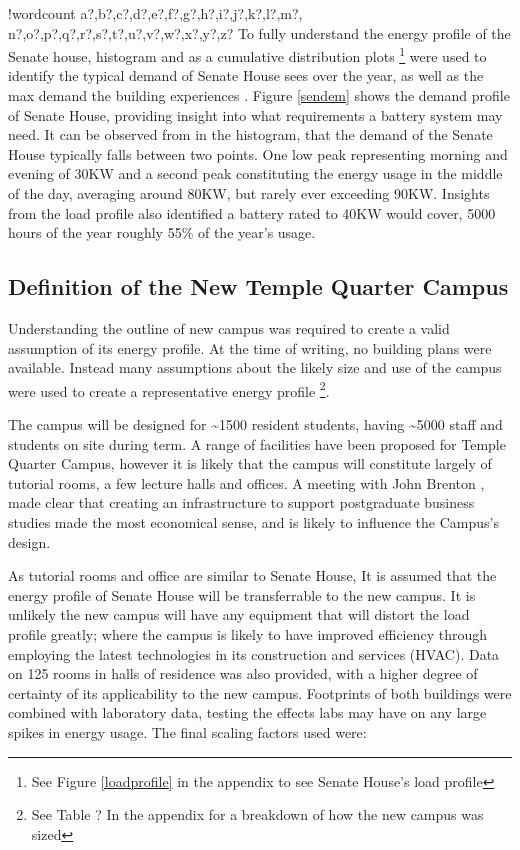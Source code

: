 \documentclass[fontsize=9.5pt]{extarticle}
\numberwithin{figure}{section} %
\newcounter{words}
\newenvironment{counted}{%
  \setcounter{words}{0}
  \SearchList!{wordcount}{\stepcounter{words}}
    {a?,b?,c?,d?,e?,f?,g?,h?,i?,j?,k?,l?,m?,
    n?,o?,p?,q?,r?,s?,t?,u?,v?,w?,x?,y?,z?}
  \UndoBoundary{'}
  \SearchOrder{p;}}{%
  \StopSearching}
\begin{document}
\begin{counted}
To fully understand the energy profile of the Senate house, histogram
and as a cumulative distribution plots
\footnote{See Figure \ref{loadprofile} in the appendix to see Senate House's load profile}
were used to identify the typical demand of Senate House sees over the
year, as well as the max demand the building experiences
\autocite{combined-heat-power-buildings}. Figure \ref{sendem} shows the
demand profile of Senate House, providing insight into what requirements
a battery system may need. It can be observed from in the histogram,
that the demand of the Senate House typically falls between two points.
One low peak representing morning and evening of 30KW and a second peak
constituting the energy usage in the middle of the day, averaging around
80KW, but rarely ever exceeding 90KW. Insights from the load profile
also identified a battery rated to 40KW would cover, 5000 hours of the
year roughly 55\% of the year's usage.

\subsection{Definition of the New Temple Quarter
Campus}\label{definition-of-the-new-temple-quarter-campus}

Understanding the outline of new campus was required to create a valid
assumption of its energy profile. At the time of writing, no building
plans were available. Instead many assumptions about the likely size and
use of the campus were used to create a representative energy profile
\footnote{See Table ? In the appendix for a breakdown of how the new campus was sized}.

The campus will be designed for \textasciitilde{}1500 resident students,
having \textasciitilde{}5000 staff and students on site during term. A
range of facilities have been proposed for Temple Quarter Campus,
however it is likely that the campus will constitute largely of tutorial
rooms, a few lecture halls and offices. A meeting with John Brenton
\autocite{Jbrentmeet}, made clear that creating an infrastructure to
support postgraduate business studies made the most economical sense,
and is likely to influence the Campus's design.

As tutorial rooms and office are similar to Senate House, It is assumed
that the energy profile of Senate House will be transferrable to the new
campus. It is unlikely the new campus will have any equipment that will
distort the load profile greatly; where the campus is likely to have
improved efficiency through employing the latest technologies in its
construction and services (HVAC). Data on 125 rooms in halls of
residence was also provided, with a higher degree of certainty of its
applicability to the new campus. Footprints of both buildings were
combined with laboratory data, testing the effects labs may have on any
large spikes in energy usage. The final scaling factors used were:


\end{counted}
\end{document}
